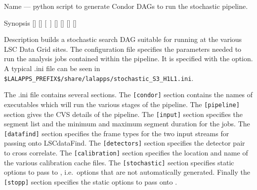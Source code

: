 \begin{entry}
\item[Name]
 --- python script to generate Condor DAGs
to run the stochastic pipeline.

\item[Synopsis]
 \newline \hspace*{0.5in}
[] \newline \hspace*{0.5in}
[] \newline \hspace*{0.5in}
[~] \newline \hspace*{0.5in}
[] \newline \hspace*{0.5in}
[] \newline \hspace*{0.5in}
[] \newline \hspace*{0.5in}
[] \newline \hspace*{0.5in}
~ \newline \hspace*{0.5in}
~

\item[Description]
 builds a stochastic search DAG suitable
for running at the various LSC Data Grid sites. The configuration file
specifies the parameters needed to run the analysis jobs contained
within the pipeline. It is specified with the 
option. A typical .ini file can be seen in\\
\texttt{\$LALAPPS\_PREFIX\$/share/lalapps/stochastic\_S3\_H1L1.ini}.

The .ini file contains several sections. The \verb$[condor]$ section
contains the names of executables which will run the various stages of
the pipeline. The \verb$[pipeline]$ section gives the CVS details of the
pipeline. The \verb$[input]$ section specifies the segment list and the
minimum and maximum segment duration for the jobs. The \verb$[datafind]$
section specifies the frame types for the two input streams for passing
onto LSCdataFind. The \verb$[detectors]$ section specifies the detector
pair to cross correlate. The \verb$[calibration]$ section specifies the
location and name of the various calibration cache files. The
\verb$[stochastic]$ section specifies static options to pass to
, i.e.~options that are not automatically
generated. Finally the \verb$[stopp]$ section specifies the static
options to pass onto .


\end{entry}
